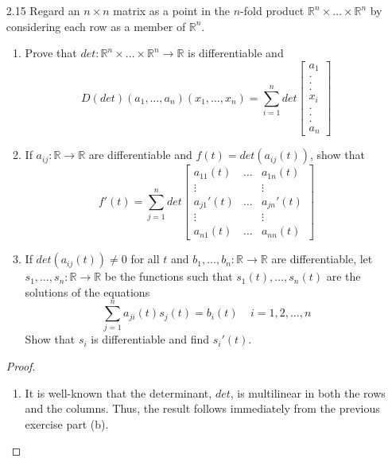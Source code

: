 \begin{enumerate}
    \item[2.15] Regard an \( n \times n \) matrix as a point in the \(n\)-fold product \( \mathbb{R}^n \times \ldots \times \mathbb{R}^n \) by considering each row as a member of \( \mathbb{R}^n \).
    \begin{enumerate}
        \item Prove that \( det: \mathbb{R}^n \times \ldots \times \mathbb{R}^n \rightarrow \mathbb{R}\) is differentiable and
        \[
        D(det)(a_1,\ldots,a_n)(x_1,\ldots,x_n) = \sum_{i=1}^n det \begin{bmatrix} a_1 \\ . \\ . \\ . \\ x_i \\ . \\ . \\ . \\ a_n \end{bmatrix}
        \]
        
        \item If \( a_{ij}: \mathbb{R} \rightarrow \mathbb{R} \) are differentiable and \( f(t) = det(a_{ij}(t)) \), show that
        \[
        f'(t) = \sum_{j=1}^n det \begin{bmatrix} a_{11}(t) & \ldots & a_{1n}(t) \\ \vdots & & \vdots \\ a_{j1}'(t) & \ldots & a_{jn}'(t) \\ \vdots & & \vdots \\ a_{n1}(t) & \ldots & a_{nn}(t) \end{bmatrix}
        \]
        
        \item If \( det(a_{ij}(t)) \neq 0 \) for all \( t \) and \( b_1,\ldots, b_n:\mathbb{R} \rightarrow \mathbb{R} \) are differentiable, let \( s_1,\ldots,s_n: \mathbb{R} \rightarrow \mathbb{R} \) be the functions such that \( s_{1}(t),\ldots,s_n(t) \) are the solutions of the equations
        \[
        \sum_{j=1}^n a_{ji}(t)s_{j}(t) = b_i(t) \;\;\;\; i = 1,2,\ldots, n
        \]
        Show that \( s_i \) is differentiable and find \( s_i'(t) \).
    \end{enumerate}
    
    \begin{proof}
    \begin{enumerate}
        \item It is well-known that the determinant, \( det \), is multilinear in both the rows and the columns. Thus, the result follows immediately from the previous exercise part (b).
        

\end{enumerate}
\end{proof}
\end{enumerate}
